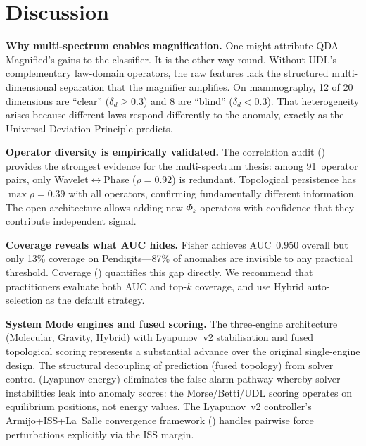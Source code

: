 \documentclass{article}
\begin{document}
\section{Discussion}
\label{sec:discussion}

\textbf{Why multi-spectrum enables magnification.} One might attribute QDA-Magnified's gains to the classifier. It is the other way round. Without UDL's complementary law-domain operators, the raw features lack the structured multi-dimensional separation that the magnifier amplifies. On mammography, 12 of 20 dimensions are ``clear'' ($\delta_d \geq 0.3$) and 8 are ``blind'' ($\delta_d < 0.3$). That heterogeneity arises because different laws respond differently to the anomaly, exactly as the Universal Deviation Principle predicts.

\textbf{Operator diversity is empirically validated.} The correlation audit () provides the strongest evidence for the multi-spectrum thesis: among 91~operator pairs, only Wavelet$\leftrightarrow$Phase ($\rho{=}0.92$) is redundant. Topological persistence has $\max \rho{=}0.39$ with all operators, confirming fundamentally different information. The open architecture allows adding new $\Phi_k$ operators with confidence that they contribute independent signal.

\textbf{Coverage reveals what AUC hides.} Fisher achieves AUC~$0.950$ overall but only 13\% coverage on Pendigits---87\% of anomalies are invisible to any practical threshold. Coverage () quantifies this gap directly. We recommend that practitioners evaluate both AUC and top-$k$ coverage, and use Hybrid auto-selection as the default strategy.

\textbf{System Mode engines and fused scoring.} The three-engine architecture (Molecular, Gravity, Hybrid) with Lyapunov~v2 stabilisation and fused topological scoring represents a substantial advance over the original single-engine design. The structural decoupling of prediction (fused topology) from solver control (Lyapunov energy) eliminates the false-alarm pathway whereby solver instabilities leak into anomaly scores: the Morse/Betti/UDL scoring operates on equilibrium positions, not energy values. The Lyapunov~v2 controller's Armijo+ISS+La~Salle convergence framework () handles pairwise force perturbations explicitly via the ISS margin.
\end{document}
